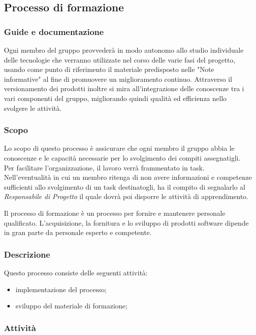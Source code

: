 		
		
		
		
		\subsection{Processo di formazione}
		
	\subsubsection{Guide e documentazione}
	Ogni membro del gruppo provvederà in modo autonomo allo studio individuale delle tecnologie che verranno utilizzate nel corso delle varie fasi del progetto, usando come punto di riferimento il materiale predisposto nelle "Note informative" al fine di promuovere un miglioramento continuo. Attraverso il versionamento dei prodotti inoltre si mira all'integrazione delle conoscenze tra i vari componenti del gruppo, migliorando quindi qualità ed efficienza nello svolgere le attività.
	
	\subsubsection{Scopo}
	Lo scopo di questo processo è assicurare che ogni membro il gruppo abbia le conoscenze e le capacità necessarie per lo svolgimento dei compiti assegnatigli. Per facilitare l'organizzazione, il lavoro verrà frammentato in task. Nell'eventualità in cui un membro ritenga di non avere informazioni e competenze sufficienti allo svolgimento di un task destinatogli, ha il compito di segnalarlo al \textit{Responsabile di Progetto} il quale dovrà poi disporre le attività di apprendimento.
	
		Il processo di formazione è un processo per fornire e mantenere personale qualificato. L'acquisizione, la fornitura e lo sviluppo  di prodotti software dipende in gran parte da personale esperto e competente. 
		\subsubsection{Descrizione}
		Questo processo consiste delle seguenti attività:
		\begin{itemize}
			\item implementazione del processo;
			\item sviluppo del materiale di formazione;
		\end{itemize}
		\subsubsection{Attività}
